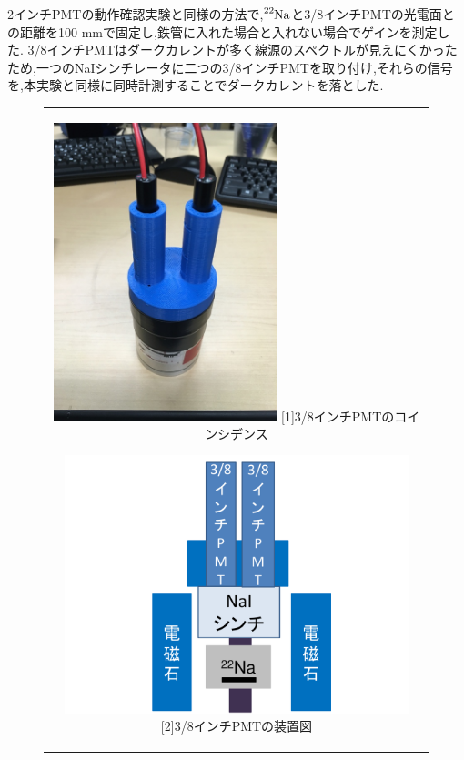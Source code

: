 2インチPMTの動作確認実験と同様の方法で,$\ce{^{22}Na}$と3/8インチPMTの光電面との距離を100 mmで固定し,鉄管に入れた場合と入れない場合でゲインを測定した.
3/8インチPMTはダークカレントが多く線源のスペクトルが見えにくかったため,一つのNaIシンチレータに二つの3/8インチPMTを取り付け,それらの信号を,本実験と同様に同時計測することでダークカレントを落とした.

\begin{figure}[h]
  \begin{center}
    \begin{tabular}{c}
      \begin{minipage}[h]{0.4\hsize}    
        \begin{center}
          \includegraphics[width=6.5cm]{fig/iguchi/PPMT.jpg}
	\hspace{3cm}[1]3/8インチPMTのコインシデンス
     \end{center}
    \end{minipage}
      \begin{minipage}[h]{0.6\hsize}    
        \begin{center}
          \includegraphics[width=10cm]{fig/iguchi/miniset.pdf}
         \hspace{3cm}[2]3/8インチPMTの装置図
         \end{center}
        \end{minipage}
     
     \end{tabular}
    \end{center}
   \end{figure}
   
